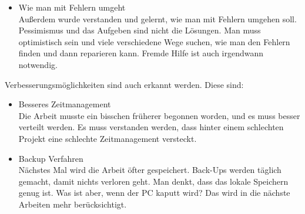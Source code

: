 \begin{itemize}
	\item Wie man mit Fehlern umgeht \\
	
	Außerdem wurde verstanden und gelernt, wie man mit Fehlern umgehen soll. Pessimismus und das Aufgeben sind nicht die Lösungen. Man muss optimistisch sein und viele verschiedene Wege suchen, wie man den Fehlern finden und dann reparieren kann. Fremde Hilfe ist auch irgendwann notwendig.
\end{itemize}	
	 Verbesserungsmöglichkeiten sind auch erkannt werden. Diese sind: 
\begin{itemize}	
	
	\item Besseres Zeitmanagement \\
	
	Die Arbeit musste ein bisschen früherer begonnen worden, und es muss besser verteilt werden. Es muss verstanden werden, dass hinter einem schlechten Projekt eine schlechte Zeitmanagement versteckt.
	
	\item Backup Verfahren \\
	
	Nächstes Mal wird die Arbeit öfter gespeichert. Back-Ups werden täglich gemacht, damit nichts verloren geht. Man denkt, dass das lokale Speichern genug ist. Was ist aber, wenn der PC kaputt wird? Das wird in die nächste Arbeiten mehr berücksichtigt.
\end{itemize}


\newpage 